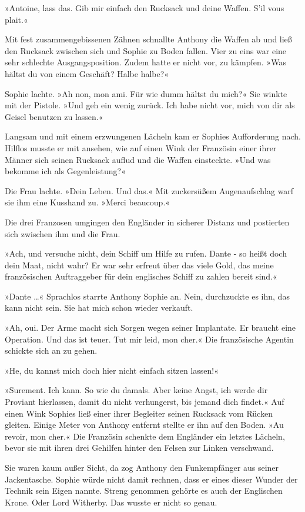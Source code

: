 »Antoine, lass das. Gib mir einfach den Rucksack und deine Waffen.
S'il vous plait.«

Mit fest zusammengebissenen Zähnen schnallte Anthony die Waffen ab
und ließ den Rucksack zwischen sich und Sophie zu Boden fallen.
Vier zu eins war eine sehr schlechte Ausgangsposition. Zudem hatte
er nicht vor, zu kämpfen. »Was hältst du von einem Geschäft? Halbe
halbe?«

Sophie lachte. »Ah non, mon ami. Für wie dumm hältst du mich?« Sie
winkte mit der Pistole. »Und geh ein wenig zurück. Ich habe nicht
vor, mich von dir als Geisel benutzen zu lassen.«

Langsam und mit einem erzwungenen Lächeln kam er Sophies
Aufforderung nach. Hilflos musste er mit ansehen, wie auf einen
Wink der Französin einer ihrer Männer sich seinen Rucksack auflud
und die Waffen einsteckte. »Und was bekomme ich als
Gegenleistung?«

Die Frau lachte. »Dein Leben. Und das.« Mit zuckersüßem
Augenaufschlag warf sie ihm eine Kusshand zu. »Merci beaucoup.«

Die drei Franzosen umgingen den Engländer in sicherer Distanz und
postierten sich zwischen ihm und die Frau.

»Ach, und versuche nicht, dein Schiff um Hilfe zu rufen. Dante - so
heißt doch dein Maat, nicht wahr? Er war sehr erfreut über das
viele Gold, das meine französischen Auftraggeber für dein
englisches Schiff zu zahlen bereit sind.«

»Dante …« Sprachlos starrte Anthony Sophie an. Nein, durchzuckte es
ihn, das kann nicht sein. Sie hat mich schon wieder verkauft.

»Ah, oui. Der Arme macht sich Sorgen wegen seiner Implantate. Er
braucht eine Operation. Und das ist teuer. Tut mir leid, mon cher.«
Die französische Agentin schickte sich an zu gehen.

»He, du kannst mich doch hier nicht einfach sitzen lassen!«

»Surement. Ich kann. So wie du damals. Aber keine Angst, ich werde
dir Proviant hierlassen, damit du nicht verhungerst, bis jemand
dich findet.« Auf einen Wink Sophies ließ einer ihrer Begleiter
seinen Rucksack vom Rücken gleiten. Einige Meter von Anthony
entfernt stellte er ihn auf den Boden. »Au revoir, mon cher.« Die
Französin schenkte dem Engländer ein letztes Lächeln, bevor sie mit
ihren drei Gehilfen hinter den Felsen zur Linken verschwand.

Sie waren kaum außer Sicht, da zog Anthony den Funkempfänger aus
seiner Jackentasche. Sophie würde nicht damit rechnen, dass er
eines dieser Wunder der Technik sein Eigen nannte. Streng genommen
gehörte es auch der Englischen Krone. Oder Lord Witherby. Das
wusste er nicht so genau.

